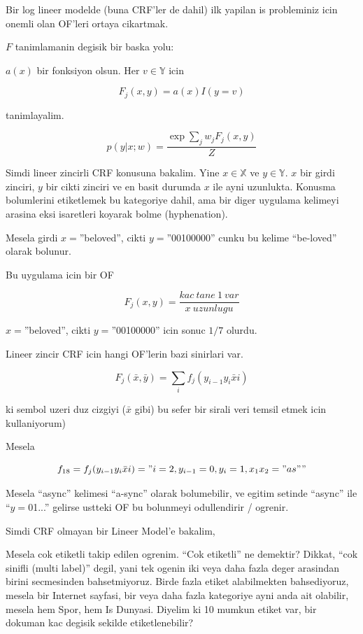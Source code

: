 \documentclass[12pt,fleqn]{article}\usepackage{../common}
\begin{document}
Bir log lineer modelde (buna CRF'ler de dahil) ilk yapilan is probleminiz
icin onemli olan OF'leri ortaya cikartmak.

$F$ tanimlamanin degisik bir baska yolu:

$a(x)$ bir fonksiyon olsun. Her $v \in \mathbb{Y}$ icin

$$ F_j(x,y) = a(x) I(y=v)$$

tanimlayalim. 

$$ p(y|x;w) = \frac{\exp \sum_j w_j F_j (x,y)}{Z} $$

Simdi lineer zincirli CRF konusuna bakalim. Yine $x \in \mathbb{X}$ ve $y
\in \mathbb{Y}$.  
$x$ bir girdi zinciri, $y$ bir cikti zinciri ve en basit
durumda $x$ ile ayni uzunlukta. Konusma bolumlerini etiketlemek bu
kategoriye dahil, ama bir diger uygulama kelimeyi arasina eksi isaretleri
koyarak bolme (hyphenation). 

Mesela girdi $x=$''beloved'', cikti $y=$''00100000'' cunku bu kelime
``be-loved'' olarak bolunur. 

Bu uygulama icin bir OF 

$$ F_j(x,y) = \frac{kac \ tane \ 1 \ var}{x \ uzunlugu} $$

$x=$''beloved'', cikti $y=$''00100000'' icin sonuc $1/7$ olurdu.

Lineer zincir CRF icin hangi OF'lerin bazi sinirlari var. 

$$ F_j (\bar{x},\bar{y}) = \sum_i f_j(y_{i-1}y_i\bar{x} i) $$

ki sembol uzeri duz cizgiyi ($\bar{x}$ gibi) bu sefer bir sirali veri
temsil etmek icin kullaniyorum)

Mesela

$$ f_{18} =   f_j(y_{i-1}y_i\bar{x} i) = " i=2, y_{i-1} = 0, y_i = 1,
x_1x_2 = "as" "$$

Mesela ``async'' kelimesi ``a-sync'' olarak bolumebilir, ve egitim setinde
``async'' ile ``$y=$01...'' gelirse ustteki OF bu bolunmeyi odullendirir /
ogrenir. 

Simdi CRF olmayan bir Lineer Model'e bakalim, 

Mesela cok etiketli takip edilen ogrenim. ``Cok etiketli'' ne demektir?
Dikkat, ``cok sinifli (multi label)'' degil, yani tek ogenin iki veya daha
fazla deger arasindan birini secmesinden bahsetmiyoruz. Birde fazla etiket
alabilmekten bahsediyoruz, mesela bir Internet sayfasi, bir veya daha fazla
kategoriye ayni anda ait olabilir, mesela hem Spor, hem Is Dunyasi. Diyelim
ki 10 mumkun etiket var, bir dokuman kac degisik sekilde etiketlenebilir?
\end{document}
